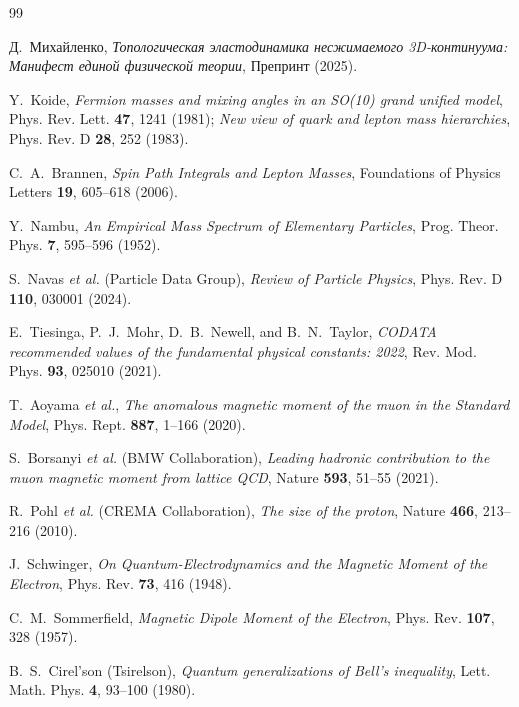 \documentclass[11pt,a4paper,oneside]{article}
\theoremstyle{plain}
\theoremstyle{definition}
\theoremstyle{remark}
\numberwithin{equation}{section}
\begin{document}
\begin{thebibliography}{99}

Д.~Михайленко, \emph{Топологическая эластодинамика несжимаемого 3D-континуума: Манифест единой физической теории}, Препринт (2025).

Y.~Koide, \emph{Fermion masses and mixing angles in an SO(10) grand unified model}, Phys. Rev. Lett. \textbf{47}, 1241 (1981); \emph{New view of quark and lepton mass hierarchies}, Phys. Rev. D \textbf{28}, 252 (1983).

C.~A.~Brannen, \emph{Spin Path Integrals and Lepton Masses}, Foundations of Physics Letters \textbf{19}, 605--618 (2006).

Y.~Nambu, \emph{An Empirical Mass Spectrum of Elementary Particles}, Prog. Theor. Phys. \textbf{7}, 595--596 (1952).

S.~Navas \textit{et al.} (Particle Data Group), \emph{Review of Particle Physics}, Phys. Rev. D \textbf{110}, 030001 (2024).

E.~Tiesinga, P.~J.~Mohr, D.~B.~Newell, and B.~N.~Taylor, \emph{CODATA recommended values of the fundamental physical constants: 2022}, Rev. Mod. Phys. \textbf{93}, 025010 (2021).

T.~Aoyama \textit{et al.}, \emph{The anomalous magnetic moment of the muon in the Standard Model}, Phys. Rept. \textbf{887}, 1--166 (2020).

S.~Borsanyi \textit{et al.} (BMW Collaboration), \emph{Leading hadronic contribution to the muon magnetic moment from lattice QCD}, Nature \textbf{593}, 51--55 (2021).

R.~Pohl \textit{et al.} (CREMA Collaboration), \emph{The size of the proton}, Nature \textbf{466}, 213--216 (2010).

J.~Schwinger, \emph{On Quantum-Electrodynamics and the Magnetic Moment of the Electron}, Phys. Rev. \textbf{73}, 416 (1948).

C.~M.~Sommerfield, \emph{Magnetic Dipole Moment of the Electron}, Phys. Rev. \textbf{107}, 328 (1957).

B.~S.~Cirel'son (Tsirelson), \emph{Quantum generalizations of Bell's inequality}, Lett. Math. Phys. \textbf{4}, 93--100 (1980).


\end{thebibliography}
\end{document}

